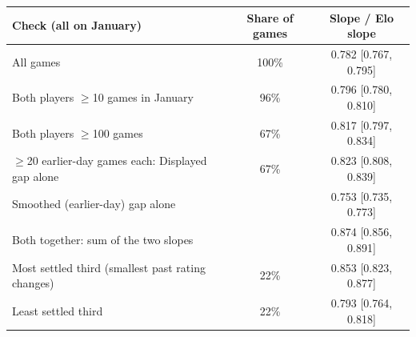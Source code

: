 \begin{tabular}{lcc}
\toprule
Check (all on January) & Share of games & Slope / Elo slope \\
\midrule
All games & 100\% & 0.782 [0.767, 0.795] \\
Both players $\ge$10 games in January & 96\% & 0.796 [0.780, 0.810] \\
Both players $\ge$100 games & 67\% & 0.817 [0.797, 0.834] \\
\midrule
$\ge$20 earlier-day games each: Displayed gap alone & 67\% & 0.823 [0.808, 0.839] \\
Smoothed (earlier-day) gap alone &  & 0.753 [0.735, 0.773] \\
Both together: sum of the two slopes &  & 0.874 [0.856, 0.891] \\
\midrule
Most settled third (smallest past rating changes) & 22\% & 0.853 [0.823, 0.877] \\
Least settled third & 22\% & 0.793 [0.764, 0.818] \\
\bottomrule
\end{tabular}
